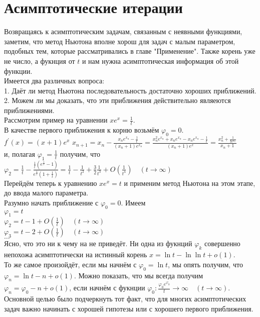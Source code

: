 \documentclass{report}
\begin{document}
\section{Асимптотические итерации}
Возвращаясь к асимптотическим задачам, связанным с неявными функциями, заметим, что метод Ньютона вполне хорош для задач с малым параметром, подобных тем, которые рассматривались в главе "Применение".
Также корень уже не число, а фукнция от $t$ и нам нужна асимптотическая информация об этой функции. \\
Имеется два различных вопроса: \\
1. Даёт ли метод Ньютона последовательность достаточно хороших приближений. \\
2. Можем ли мы доказать, что эти приближения действительно являеются приближениями. \\
Рассмотрим пример на уравнении $xe^{x}=\frac{1}{t}$. \\
В качестве первого приближения к корню возьмём $\varphi_0=0$. \\
$f^{\prime}(x)=(x+1)e^{x}$
$x_{n+1}=x_n-\frac{x_ne^{x_n}-\frac{1}{t}}{(x_n+1)e^{x_n}}=\frac{x_n^{2}e^{x_n}+x_ne^{x_n}-x_ne^{x_n}-\frac{1}{t}}{(x_n+1)e^{x}}=\frac{x_n^{2}+\frac{1}{te^{x_n}}}{x_n+1}$ \\
и, полагая $\varphi_1=\frac{1}{t}$ получим, что \\
$\varphi_2=\frac{1}{t}-\frac{\frac{1}{t}(e^{\frac{1}{t}}-1)}{e^{\frac{1}{t}}(1+\frac{1}{t})} = \frac{1}{t}-\frac{1}{t^{2}}+\frac{3}{2}\frac{1}{t^{3}}+O\left(\frac{1}{t^{4}}\right)\quad(t\to\infty)$ \\
Перейдём теперь к уравнению $xe^{x}=t$ и применим метод Ньютона на этом этапе, до ввода малого параметра. \\
Разумно начать приближение с $\varphi_0=0$. Имеем \\
$\varphi_1=t$ \\
$\varphi_2=t-1+O(\frac{1}{t})\quad(t\to\infty)$\\
$\varphi_3=t-2+O(\frac{1}{t})\quad(t\to\infty)$ \\
$\dots$ \\
Ясно, что это ни к чему на не приведёт. Ни одна из фукнций $\varphi_k$ совершенно непохожа асимптотически на истинный корень $x=\ln{t}-\ln\ln{t}+o(1)$. \\
То же самое произойдёт, если мы начнём с $\varphi_0=\ln{t}$, мы опять получим, что $\varphi_n=\ln{t}-n+o(1)$. Можно показать, что мы всегда получим $\varphi_n=\varphi_0-n+o(1)$,
если начнём с фукнции $\varphi_0: \frac{\varphi_0e^{\varphi_0}}{t}\to\infty\quad(t\to\infty)$.
Основной целью было подчеркнуть тот факт, что для многих асимптотических задач важно начинать с хорошей гипотезы или с хорошего первого приближения.\\
\newpage
\end{document}
